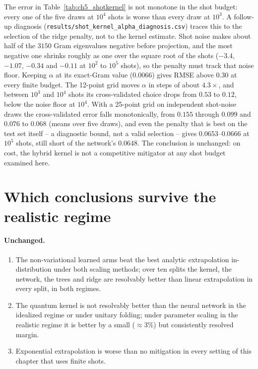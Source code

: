 \documentclass[Thesis.tex]{subfiles}
\begin{document}
The error in Table~\ref{tab:ch5_shotkernel} is not monotone in the shot budget: every
one of the five draws at $10^4$ shots is worse than every draw at $10^3$. A follow-up
diagnosis (\texttt{results/shot\_kernel\_alpha\_diagnosis.csv}) traces this to the
selection of the ridge penalty, not to the kernel estimate. Shot noise makes about
half of the $3150$ Gram eigenvalues negative before projection, and the most negative
one shrinks roughly as one over the square root of the shots ($-3.4$, $-1.07$,
$-0.34$ and $-0.11$ at $10^2$ to $10^5$ shots), so the penalty must track that noise
floor. Keeping $\alpha$ at its exact-Gram value ($0.0066$) gives RMSE above $0.30$ at
every finite budget. The 12-point grid moves $\alpha$ in steps of about $4.3\times$,
and between $10^3$ and $10^4$ shots its cross-validated choice drops from $0.53$ to
$0.12$, below the noise floor at $10^4$. With a 25-point grid on independent
shot-noise draws the cross-validated error falls monotonically, from $0.155$ through
$0.099$ and $0.076$ to $0.068$ (means over five draws), and even the penalty that is
best on the test set itself -- a diagnostic bound, not a valid selection -- gives
$0.0653$--$0.0666$ at $10^5$ shots, still short of the network's $0.0648$. The
conclusion is unchanged: on cost, the hybrid kernel is not a competitive mitigator at
any shot budget examined here.

\section{Which conclusions survive the realistic regime}
\label{sec:ch5_realistic_summary}

\paragraph{Unchanged.}
\begin{enumerate}
    \item The non-variational learned arms beat the best analytic extrapolation
    in-distribution under both scaling methods; over ten splits the kernel, the
    network, the trees and ridge are resolvably better than linear extrapolation in
    every split, in both regimes.
    \item The quantum kernel is not resolvably better than the neural network in the
    idealized regime or under unitary folding; under parameter scaling in the realistic
    regime it is better by a small ($\approx 3\%$) but consistently resolved margin.
    \item Exponential extrapolation is worse than no mitigation in every setting of
    this chapter that uses finite shots.
\end{enumerate}
\end{document}
